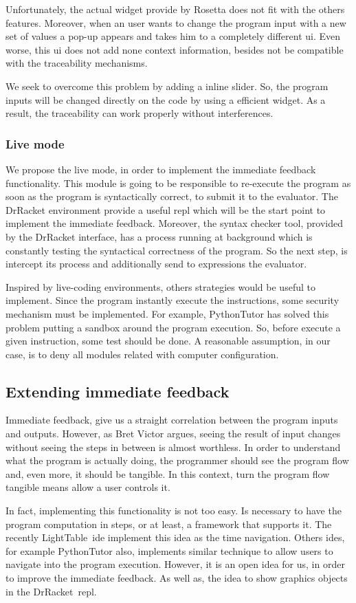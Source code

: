 Unfortunately, the actual widget provide by Rosetta does not fit with the others features. Moreover, when an user wants to change the program input with a new set of values a pop-up appears and takes him to a completely different \ac{ui}. Even worse, this \ac{ui} does not add none context information, besides not be compatible with the traceability mechanisms.

We seek to overcome this problem by adding a inline slider. So, the program inputs will be changed directly on the code by using a efficient widget. As a result, the traceability can work properly without interferences.

\subsubsection{Live mode}

We propose the live mode, in order to implement the immediate feedback functionality. This module is going to be responsible to re-execute the program as soon as the program is syntactically correct, to submit it to the evaluator. The DrRacket environment provide a useful \ac{repl} which will be the start point to implement the immediate feedback. Moreover, the syntax checker tool, provided by the DrRacket interface, has a process running at background which is constantly testing the syntactical correctness of the program. So the next step, is intercept its process and additionally send to expressions the evaluator. 

Inspired by live-coding environments, others strategies would be useful to implement. Since the program instantly execute the instructions, some security mechanism must be implemented. For example, PythonTutor has solved this problem putting a sandbox around the program execution. So, before execute a given instruction, some test should be done. A reasonable assumption, in our case, is to deny all modules related with computer configuration.

\subsection{Extending immediate feedback}

Immediate feedback, give us a straight correlation between the program inputs and outputs. However, as Bret Victor argues, seeing the result of input changes without seeing the steps in between is almost worthless. In order to understand what the program is actually doing, the programmer should see the program flow and, even more, it should be tangible. In this context, turn the program flow tangible means allow a user controls it.  

In fact, implementing this functionality is not too easy. Is necessary to have the program computation in steps, or at least, a framework that supports it. The recently LightTable~\ac{ide} implement this idea as the time navigation. Others \ac{ide}s, for example PythonTutor also, implements similar technique to allow users to navigate into the program execution. However, it is an open idea for us, in order to improve the immediate feedback. As well as, the idea to show graphics objects in the DrRacket~\ac{repl}.
